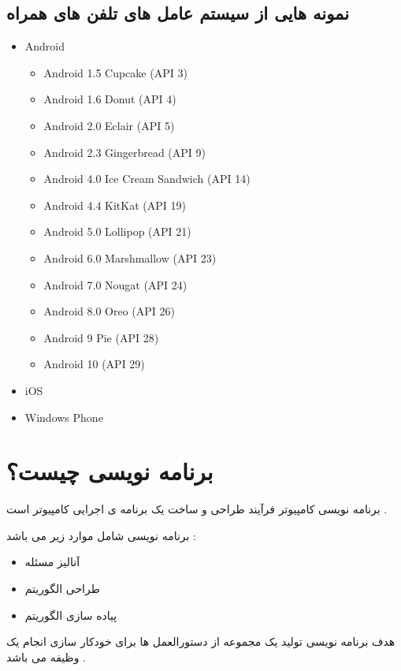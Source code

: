 \documentclass[12pt]{book}
\begin{document}
\subsection{نمونه هایی از سیستم عامل های تلفن های همراه}

\begin{latin}
\begin{itemize}
	\item Android
	\begin{itemize}
		\item Android 1.5 Cupcake (API 3) 
		\item Android 1.6 Donut (API 4) 
		\item Android 2.0 Eclair (API 5) 
		\item Android 2.3 Gingerbread (API 9) 
		\item Android 4.0 Ice Cream Sandwich (API 14) 
		\item Android 4.4 KitKat (API 19) 
		\item Android 5.0 Lollipop (API 21) 
		\item Android 6.0 Marshmallow (API 23) 
		\item Android 7.0 Nougat (API 24) 
		\item Android 8.0 Oreo (API 26) 
		\item Android 9 Pie (API 28) 
		\item Android 10 (API 29) 
	\end{itemize}
	\item iOS
	\item Windows Phone
\end{itemize}
\end{latin}

\section{برنامه نویسی چیست؟}

برنامه نویسی کامپیوتر فرآیند طراحی و ساخت یک برنامه ی اجرایی کامپیوتر است .

برنامه نویسی شامل موارد زیر می باشد :

\begin{itemize}
	\item آنالیز مسئله
	\item طراحی الگوریتم
	\item پیاده سازی الگوریتم
\end{itemize}

هدف برنامه نویسی تولید یک مجموعه از دستورالعمل ها برای خودکار سازی انجام یک وظیفه می باشد .
\end{document}
